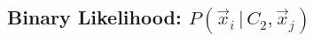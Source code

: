 \documentclass[usenatbib]{mnras}
\newcommand{\given}{\,|\,}
\newcommand{\dd}{\mathrm{d}}
\newcommand{\degree}{\ifmmode {^\circ}\else$^\circ$\ \fi}
\begin{document}
\begin{comment}
We can determine the three probabilities in Equation \ref{eq:P_obs_noise_split} empirically using the following procedure. First, we select an arbitrarily large radius around each star to search for matching pairs. We then numerically generate three normalized histograms, one for each observable: $\theta$, $\Delta V_{\rm pec}$, and $\Delta D'$. Interpolating along the histograms, for each observable, for each pair, provides the three probabilities in Equation \ref{eq:P_obs_noise_split}. What remains is to determine a large enough search radius, such that there are enough that even widely separated, genuine stellar pairs can be resolved and that there are enough stellar pairs such that the three histograms do not suffer from low number statistics. For separations too large, our assumption of independence in observables breaks down, and the split we made in Equation \ref{eq:P_obs_noise} is no longer justified. This search radius needs to be calibrated, but for now, we suggest that 1\degree should be sufficient.

Combining Equation \ref{eq:P_obs_noise_split} and \ref{eq:P_noise_marginalized} gives us the following:
\begin{eqnarray}
P(\vec{x}_i \given C_1, \vec{x}_j) &=& P(\theta \given \alpha, \delta)\ 
   P(\Delta V_{\rm pec} \given \alpha, \delta, \mu_{\alpha} \mu_{\delta})\ 
   \left| \frac{\dd \Delta V_{\rm pec}}{\dd \Delta \mu} \right| \nonumber \\
   & & \qquad \times  \int \dd \Delta D'\ P(\Delta D \given \Delta D')\ P(\Delta D' \given \alpha, \delta, D),
\end{eqnarray}
where we were able to move the conditional probabilities for $\theta$ and $\Delta V_{\rm pec}$ outside the integral over $\Delta D'$ because of their independence on distance.
\end{comment}




\subsection{Binary Likelihood: $P(\vec{x}_i \given C_2, \vec{x}_j)$}
\end{document}

